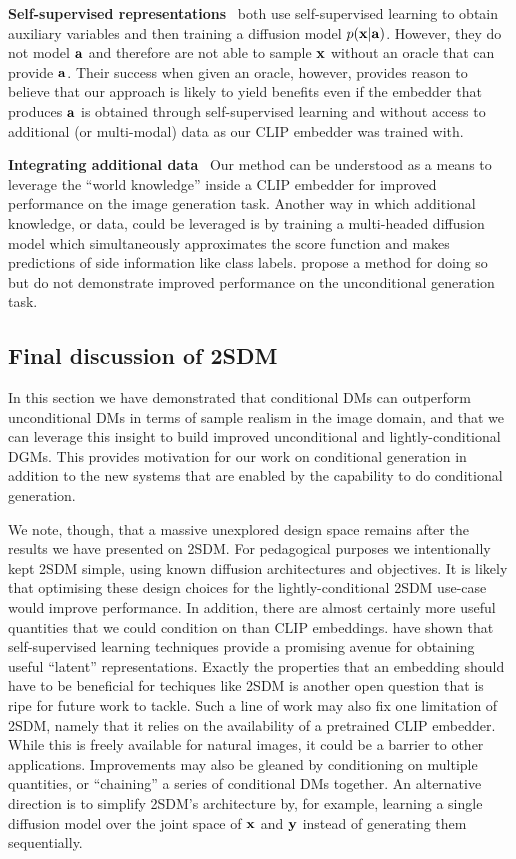 \textbf{Self-supervised representations}~
\citet{bao2022conditional,hu2022self} both use self-supervised learning to obtain auxiliary variables and then training a diffusion model $p({\mathbf{x}}|{\mathbf{a}})$. However, they do not model ${\mathbf{a}}$ and therefore are not able to sample ${\mathbf{x}}$ without an oracle that can provide ${\mathbf{a}}$. Their success when given an oracle, however, provides reason to believe that our approach is likely to yield benefits even if the embedder that produces ${\mathbf{a}}$ is obtained through self-supervised learning and without access to additional (or multi-modal) data as our CLIP embedder was trained with.

\textbf{Integrating additional data}~
Our method can be understood as a means to leverage the ``world knowledge'' inside a CLIP embedder for improved performance on the image generation task. Another way in which additional knowledge, or data, could be leveraged is by training a multi-headed diffusion model which simultaneously approximates the score function and makes predictions of side information like class labels. \citet{deja2023learning} propose a method for doing so but do not demonstrate improved performance on the unconditional generation task.

\subsection{Final discussion of 2SDM}
In this section we have demonstrated that conditional DMs can outperform unconditional DMs in terms of sample realism in the image domain, and that we can leverage this insight to build improved unconditional and lightly-conditional DGMs. This provides motivation for our work on conditional generation in addition to the new systems that are enabled by the capability to do conditional generation. 

We note, though, that a massive unexplored design space remains after the results we have presented on 2SDM. For pedagogical purposes we intentionally kept 2SDM simple, using known diffusion architectures and objectives. It is likely that optimising these design choices for the lightly-conditional 2SDM use-case would improve performance. In addition, there are almost certainly more useful quantities that we could condition on than CLIP embeddings. 
\citet{bao2022conditional,hu2022self} have shown that self-supervised learning techniques provide a promising avenue for obtaining useful ``latent'' representations. Exactly the properties that an embedding should have to be beneficial for techiques like 2SDM is another open question that is ripe for future work to tackle. Such a line of work may also fix one limitation of 2SDM, namely that it relies on the availability of a pretrained CLIP embedder. While this is freely available for natural images, it could be a barrier to other applications. Improvements may also be gleaned by conditioning on multiple quantities, or ``chaining'' a series of conditional DMs together. An alternative direction is to simplify 2SDM's architecture by, for example, learning a single diffusion model over the joint space of ${\mathbf{x}}$ and ${\mathbf{y}}$ instead of generating them sequentially.

